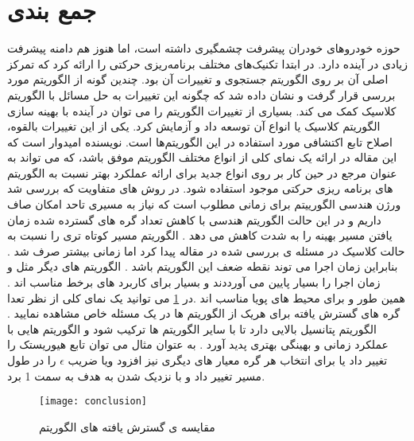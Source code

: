 

\section{جمع بندی}

حوزه خودروهای خودران پیشرفت چشمگیری داشته است، اما هنوز هم دامنه پیشرفت زیادی در آینده دارد. 
\cite{paliwal2023survey}
در ابتدا تکنیک‌های مختلف برنامه‌ریزی حرکتی را ارائه کرد که تمرکز اصلی آن بر روی الگوریتم جستجوی
  و تغییرات آن بود. چندین گونه از الگوریتم   مورد بررسی قرار گرفت و نشان داده شد که چگونه این تغییرات به حل مسائل با الگوریتم کلاسیک  کمک می کند. بسیاری از تغییرات الگوریتم   را می توان در آینده با بهینه سازی الگوریتم کلاسیک یا انواع آن توسعه داد و آزمایش کرد. یکی از این تغییرات بالقوه، اصلاح تابع اکتشافی مورد استفاده در این الگوریتم‌ها است. نویسنده امیدوار است که این مقاله در ارائه یک نمای کلی از انواع مختلف الگوریتم   موفق باشد، که می تواند به عنوان مرجع در حین کار بر روی انواع جدید برای ارائه عملکرد بهتر نسبت به الگوریتم های برنامه ریزی حرکتی موجود استفاده شود.
در روش های متفاویت که بررسی شد ورژن هندسی الگورییتم 
برای زمانی مطلوب است که نیاز به مسیری تاحد امکان صاف داریم و در این حالت الگوریتم هندسی با کاهش تعداد گره های گسترده شده زمان یافتن مسیر بهینه را به شدت کاهش می دهد .
الگوریتم 
مسیر کوتاه تری را نسبت به حالت کلاسیک در مسئله ی بررسی شده در مقاله پیدا کرد اما زمانی بیشتر صرف شد . بنابراین زمان اجرا می توند نقطه ضعف این الگوریتم باشد .
الگوریتم های دیگر مثل 
و
زمان اجرا را بسیار پایین می آورددند و بسیار برای کاربرد های برخط مناسب اند .
همین طور 
و
برای محیط های پویا مناسب اند .در 
\ref{conclusion}
 می توانید یک نمای کلی از نظر تعدا گره های گسترش یافته برای هریک از الگوریتم ها در یک مسئله خاص مشاهده نمایید .
 الگوریتم 
 پتانسیل بالایی دارد تا با سایر الگوریتم ها ترکیب شود و الگوریتم هایی با عملکرد زمانی و بهینگی بهتری پدید آورد . به عتوان مثال می توان تابع هیوریستک را تغییر داد یا برای انتخاب هر گره معیار های دیگری نیز افزود ویا ضریب 
 $\epsilon$
 را در طول مسیر تغییر داد و با نزدیک شدن به هدف به سمت 1 برد. 
\begin{figure}[h]
	\texttt{[image: conclusion]}
	\centering
	\caption{مقایسه ی گسترش یافته های الگوریتم }
	\cite{paliwal2023survey}
	\label{conclusion}
\end{figure}
\